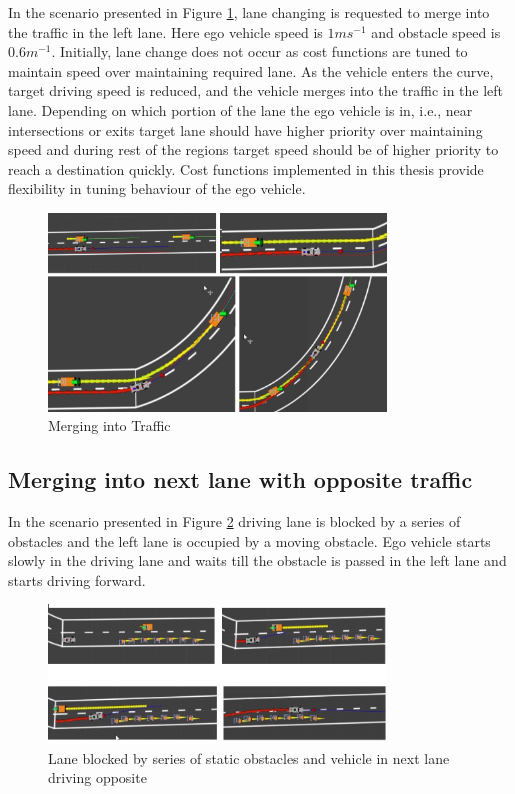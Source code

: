 In the scenario presented in Figure \ref{merging1}, lane changing is requested to merge into the traffic in the left lane. Here ego vehicle speed is $1ms^{-1}$ and obstacle speed is $0.6m^{-1}$. Initially, lane change does not occur as cost functions are tuned to maintain speed over maintaining required lane. As the vehicle enters the curve, target driving speed is reduced, and the vehicle merges into the traffic in the left lane. Depending on which portion of the lane the ego vehicle is in, i.e., near intersections or exits target lane should have higher priority over maintaining speed and during rest of the regions target speed should be of higher priority to reach a destination quickly. Cost functions implemented in this thesis provide flexibility in tuning behaviour of the ego vehicle. 

\begin{figure}[h]
    \centering
    \includegraphics[width=0.8\textwidth]{Images/evaluation/merging1.jpg}
    \caption{Merging into Traffic}
    \label{merging1}
\end{figure}

\subsection{Merging into next lane with opposite traffic}

In the scenario presented in Figure \ref{series_obstacles} driving lane is blocked by a series of obstacles and the left lane is occupied by a moving obstacle. Ego vehicle starts slowly in the driving lane and waits till the obstacle is passed in the left lane and starts driving forward. 
\begin{figure}[h]
    \centering
    \includegraphics[width=0.8\textwidth]{Images/evaluation/series_lane_blocked1.jpg}
    \caption{Lane blocked by series of static obstacles and vehicle in next lane driving opposite}
    \label{series_obstacles}
\end{figure}

